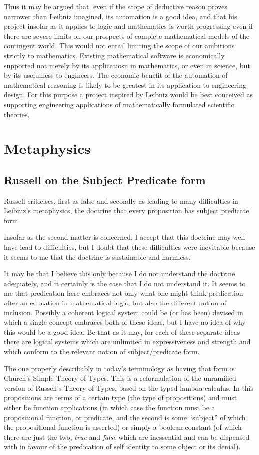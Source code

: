 \documentclass{rbjk}
\begin{document}
\begin{article}
Thus it may be argued that, even if the scope of deductive reason proves narrower than Leibniz imagined, its automation is a good idea, and that his project insofar as it applies to logic and mathematics is worth progressing even if there are severe limits on our prospects of complete mathematical models of the contingent world.
This would not entail limiting the scope of our ambitions strictly to mathematics.
Existing mathematical software is economically supported not merely by its applicatiosn in mathematics, or even in science, but by its usefulness to engineers.
The economic benefit of the automation of mathematical reasoning is likely to be greatest in its application to engineering design.
For this purpose a project inspired by Leibniz would be best conceived as supporting engineering applications of mathematically formulated scientific theories.

\section{Metaphysics}

\subsection{Russell on the Subject Predicate form}

Russell criticises, first as false and secondly as leading to many difficulties in Leibniz's metaphysics, the doctrine that every proposition has subject predicate form.

Insofar as the second matter is concerned, I accept that this doctrine may well have lead to difficulties, but I doubt that these difficulties were inevitable because it seems to me that the doctrine is sustainable and harmless.

It may be that I believe this only because I do not understand the doctrine adequately, and it certainly is the case that I do not understand it.
It seems to me that predication here embraces not only what one might think predication after an education in mathematical logic, but also the different notion of inclusion.
Possibly a coherent logical system could be (or has been) devised in which a single concept embraces both of these ideas, but I have no idea of why this would be a good idea.
Be that as it may, for each of these separate ideas there are logical systems which are unlimited in expressiveness and strength and which conform to the relevant notion of subject/predicate form.

The one properly describably in today's terminology as having that form is Church's Simple Theory of Types.
This is a reformulation of the unramified version of Russell's Theory of Types, based on the typed lambda-calculus.
In this propositions are terms of a certain type (the type of propositions) and must either be function applications (in which case the function must be a propositional function, or predicate, and the second is some ``subject'' of which the propositional function is asserted) or simply a boolean constant  (of which there are just the two, {\it true} and {\it false} which are inessential and can be dispensed with in favour of the predication of self identity to some object or its denial).


\end{article}
\end{document}
